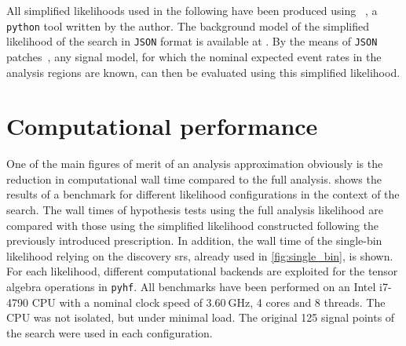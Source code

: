 All simplified likelihoods used in the following have been produced using ~\cite{simplify}, a \texttt{python} tool written by the author.
The background model of the simplified likelihood of the \onelepton search in \texttt{JSON} format is available at \cite{simplified_lh_SUSY-2019-08}.
By the means of \texttt{JSON} patches~\cite{json_patch}, any signal model, for which the nominal expected event rates in the analysis regions are known, can then be evaluated using this simplified likelihood.


\section{Computational performance}\label{sec:cpu_performance}

One of the main figures of merit of an analysis approximation obviously is the reduction in computational wall time compared to the full analysis.  shows the results of a benchmark for different likelihood configurations in the context of the \onelepton search.
The wall times of hypothesis tests using the full analysis likelihood are compared with those using the simplified likelihood constructed following the previously introduced prescription.
In addition, the wall time of the single-bin likelihood relying on the discovery \glspl{sr}, already used in \cref{fig:single_bin}, is shown.
For each likelihood, different computational backends are exploited for the tensor algebra operations in \texttt{pyhf}. All benchmarks have been performed on an Intel i7-4790 CPU with a nominal clock speed of $\SI{3.60}{\GHz}$, 4 cores and 8 threads.
The CPU was not isolated, but under minimal load.
The original 125 signal points of the \onelepton search were used in each configuration.

